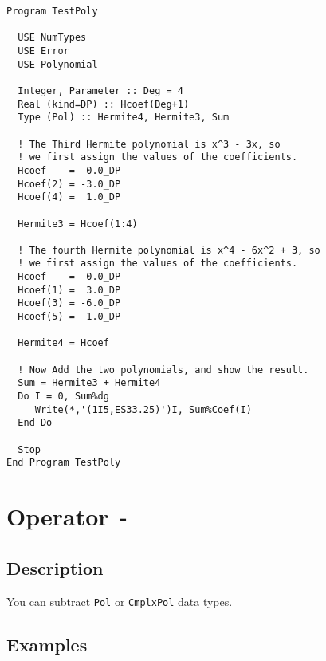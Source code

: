 \begin{lstlisting}[emph=Type,
                   emphstyle=\color{blue},
                   frame=trBL,
                   caption=Adding polynomials.,
                   label=pluspol]
Program TestPoly

  USE NumTypes
  USE Error
  USE Polynomial

  Integer, Parameter :: Deg = 4
  Real (kind=DP) :: Hcoef(Deg+1)
  Type (Pol) :: Hermite4, Hermite3, Sum

  ! The Third Hermite polynomial is x^3 - 3x, so
  ! we first assign the values of the coefficients.
  Hcoef    =  0.0_DP
  Hcoef(2) = -3.0_DP
  Hcoef(4) =  1.0_DP

  Hermite3 = Hcoef(1:4)

  ! The fourth Hermite polynomial is x^4 - 6x^2 + 3, so
  ! we first assign the values of the coefficients.
  Hcoef    =  0.0_DP
  Hcoef(1) =  3.0_DP
  Hcoef(3) = -6.0_DP
  Hcoef(5) =  1.0_DP

  Hermite4 = Hcoef

  ! Now Add the two polynomials, and show the result.
  Sum = Hermite3 + Hermite4
  Do I = 0, Sum%dg
     Write(*,'(1I5,ES33.25)')I, Sum%Coef(I)
  End Do

  Stop
End Program TestPoly
\end{lstlisting}

\section{Operator \texttt{-}}

\subsection{Description}

You can subtract \texttt{Pol} or \texttt{CmplxPol} data types.

\subsection{Examples}

